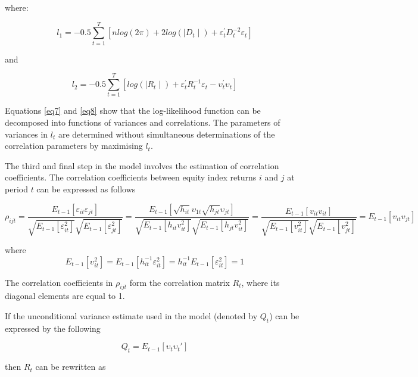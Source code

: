 \documentclass[11pt,preprint, authoryear]{elsarticle}
\numberwithin{equation}{section}
\numberwithin{figure}{section}
\numberwithin{table}{section}
\begin{document}
where:

\begin{equation}
l_1 = -0.5 \sum_{t=1}^{T}[nlog(2\pi) +  2 log(\mid D_t \mid ) + \varepsilon_t^{'} D_t^{-2} \varepsilon_t]
\label{eq7}
\end{equation}

and

\begin{equation}
l_2= -0.5 \sum_{t=1}^{T} [log(\mid R_t \mid ) + \varepsilon_t^{'}R_t^{-1}\varepsilon_t - \upsilon_t^{'}\upsilon_t]
\label{eq8}
\end{equation}

Equations \ref{eq7} and \ref{eq8} show that the log-likelihood function
can be decomposed into functions of variances and correlations. The
parameters of variances in \(l_t\) are determined without simultaneous
determinations of the correlation parameters by maximising \(l_t\).

The third and final step in the model involves the estimation of
correlation coefficients. The correlation coefficients between equity
index returns \(i\) and \(j\) at period \(t\) can be expressed as
follows

\begin{equation}
\rho_{ijt} = \frac{E_{t-1}[\varepsilon_{it}\varepsilon_{jt}]}{\sqrt{E_{t-1}[\varepsilon_{it}^2]} \sqrt{E_{t-1}[\varepsilon_{jt}^2]}} = \frac{E_{t-1}[\sqrt{h_{it}}\upsilon_{1t}\sqrt{h_{jt}} \upsilon_{jt}]}{\sqrt{E_{t-1}[h_{it}v_{it}^2]}\sqrt{E_{t-1}[h_{jt}v_{it}^2]}} = \frac{E_{t-1}[v_{it}v_{it}]}{\sqrt{E_{t-1}[v_{it}^2]}\sqrt{E_{t-1}[v_{jt}^2]}} = E_{t-1}[v_{it}v_{jt}]
\label{eq9}
\end{equation}

where \begin{equation}
E_{t-1}[\upsilon_{it}^2] = E_{t-1}[h_{it}^{-1}\varepsilon_{it}^2] = h_{it}^{-1}E_{t-1}[\varepsilon_{it}^2] = 1
\label{eq15}
\end{equation}

The correlation coefficients in \(\rho_{ijt}\) form the correlation
matrix \(R_t\), where its diagonal elements are equal to 1.

If the unconditional variance estimate used in the model (denoted by
\(Q_t\)) can be expressed by the following

\begin{equation}
Q_{t} = E_{t-1}[\upsilon_t\upsilon_t{'}]
\label{eq10}
\end{equation}

then \(R_t\) can be rewritten as
\end{document}
